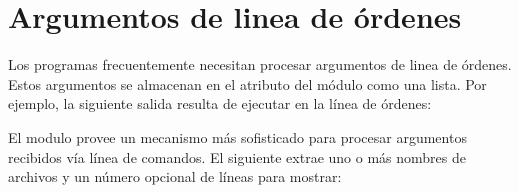 \documentclass[a4,10pt,spanish]{sphinxmanual}
\begin{document}
\section{Argumentos de linea de órdenes}
\label{\detokenize{tutorial/stdlib:command-line-arguments}}\label{\detokenize{tutorial/stdlib:tut-command-line-arguments}}
\sphinxAtStartPar
Los programas frecuentemente necesitan procesar argumentos de linea de órdenes. Estos argumentos se almacenan en el atributo  del módulo  como una lista.  Por ejemplo, la siguiente salida resulta de ejecutar  en la línea de órdenes:

\begin{sphinxVerbatim}[commandchars=\\\{\}]
 
\end{sphinxVerbatim}

\sphinxAtStartPar
El modulo  provee un mecanismo más sofisticado para procesar argumentos recibidos vía línea de comandos. El siguiente  extrae uno o más nombres de archivos y un número opcional de líneas para mostrar:

\begin{sphinxVerbatim}[commandchars=\\\{\}]
 

    
      
 
   
  
\end{sphinxVerbatim}
\end{document}
